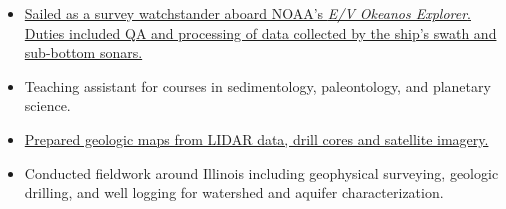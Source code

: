 \begin{itemize}
\item \href{http://www.niutoday.info/2014/04/17/niu-student-lands-coveted-internship-aboard-exploration-ship/}
  {Sailed as a survey watchstander aboard NOAA's \textit{E/V Okeanos Explorer}.
  Duties included QA and processing of data collected by the ship's swath and sub-bottom sonars.}
\end{itemize}

\begin{itemize}
\item Teaching assistant for courses in sedimentology, paleontology, and planetary science.
\end{itemize}

\begin{itemize}
\item \href{http://www.isgs.illinois.edu/sites/isgs/files/maps/isgs-quads/aurora-south-sg.pdf}{Prepared geologic maps from LIDAR data, drill cores and satellite imagery.}
\item Conducted fieldwork around Illinois including geophysical surveying, geologic drilling, and well logging for watershed and aquifer characterization. 
\end{itemize}
